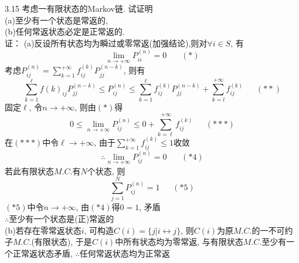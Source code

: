 3.15 考虑一有限状态的Markov链. 试证明\\
(a)至少有一个状态是常返的,\\
(b)任何常返状态必定是正常返的.\\
证：
(a)反设所有状态均为瞬过或零常返(加强结论),则对$\forall i \in S$, 有
	\[
	\lim_{n\rightarrow +\infty} P^{(n)}_{ii} = 0~~~~~~~~(*)
	\]
	考虑$P^{(n)}_{ij} = \sum\limits^{+\infty}_{k=1} f^{(k)}_{ij} P^{(n-k)}_{jj}$, 则有
	\[
	\sum^\ell_{k=1} f{(k)}_{ij} P^{(n-k)}_{jj} \leqslant P^{(n)}_{ij} \leqslant \sum^\ell_{k=1} f^{(k)}_{ij} P^{(n-k)}_{jj} + \sum^{+\infty}_{k=l} f^{(k)}_{ij}~~~~~~~(**)
	\]
	固定$\ell$, 令$n \rightarrow +\infty$, 则由$(*)$得
	\[
	0 \leqslant \lim_{n\rightarrow +\infty} P^{(n)}_{ij} \leqslant 0 + \sum^{+\infty}_{k=\ell} f^{(k)}_{ij}~~~~~~~(***)
	\]
	在$(***)$中令$\ell \rightarrow +\infty$, 由于$\sum\limits^{+\infty}_{k=1} f^{(k)}_{ij} \leqslant 1$收敛\\
	\[
	\therefore \lim_{n\rightarrow +\infty} P^{(n)}_{ij} = 0 ~~~~~~~~(*4)
	\]
	若此有限状态$M.C.$有$N$个状态, 则
	\[
	\sum^{N}_{j=1} P^{(n)}_{ij} = 1~~~~~~~(*5)
	\]
	$(*5)$中令$n\rightarrow +\infty$, 由$(*4)$得$0=1$, 矛盾\\
	$\therefore$至少有一个状态是(正)常返的\\
(b)若存在零常返状态$i$, 可构造$C(i) = \{j|i\leftrightarrow j\}$, 
	则$C(i)$为原$M.C.$的一不可约子$M.C.$(有限状态), 
	于是$C(i)$中所有状态均为零常返, 与有限状态$M.C.$至少有一个正常返状态矛盾, $\therefore$任何常返状态均为正常返


